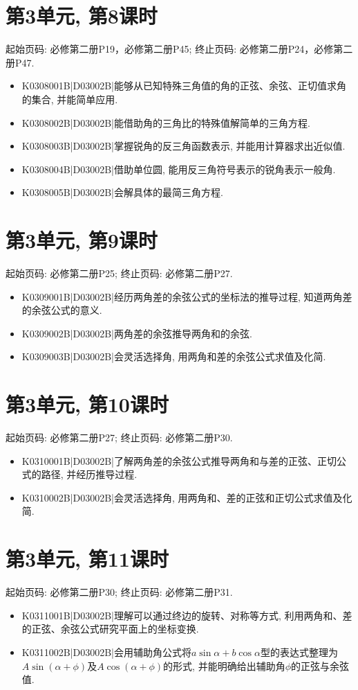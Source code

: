\section*{第3单元, 第8课时}
起始页码: 必修第二册P19，必修第二册P45; 终止页码: 必修第二册P24，必修第二册P47.
\begin{itemize}
\item K0308001B|D03002B|能够从已知特殊三角值的角的正弦、余弦、正切值求角的集合, 并能简单应用.
\item K0308002B|D03002B|能借助角的三角比的特殊值解简单的三角方程.
\item K0308003B|D03002B|掌握锐角的反三角函数表示, 并能用计算器求出近似值.
\item K0308004B|D03002B|借助单位圆, 能用反三角符号表示的锐角表示一般角.
\item K0308005B|D03002B|会解具体的最简三角方程.
\end{itemize}

\section*{第3单元, 第9课时}
起始页码: 必修第二册P25; 终止页码: 必修第二册P27.
\begin{itemize}
\item K0309001B|D03002B|经历两角差的余弦公式的坐标法的推导过程, 知道两角差的余弦公式的意义.
\item K0309002B|D03002B|两角差的余弦推导两角和的余弦.
\item K0309003B|D03002B|会灵活选择角, 用两角和差的余弦公式求值及化简.
\end{itemize}

\section*{第3单元, 第10课时}
起始页码: 必修第二册P27; 终止页码: 必修第二册P30.
\begin{itemize}
\item K0310001B|D03002B|了解两角差的余弦公式推导两角和与差的正弦、正切公式的路径, 并经历推导过程.
\item K0310002B|D03002B|会灵活选择角, 用两角和、差的正弦和正切公式求值及化简.
\end{itemize}

\section*{第3单元, 第11课时}
起始页码: 必修第二册P30; 终止页码: 必修第二册P31.
\begin{itemize}
\item K0311001B|D03002B|理解可以通过终边的旋转、对称等方式, 利用两角和、差的正弦、余弦公式研究平面上的坐标变换.
\item K0311002B|D03002B|会用辅助角公式将$a\sin\alpha+b\cos\alpha$型的表达式整理为$A\sin(\alpha+\phi)$及$A\cos(\alpha+\phi)$的形式, 并能明确给出辅助角$\phi$的正弦与余弦值.
\end{itemize}

